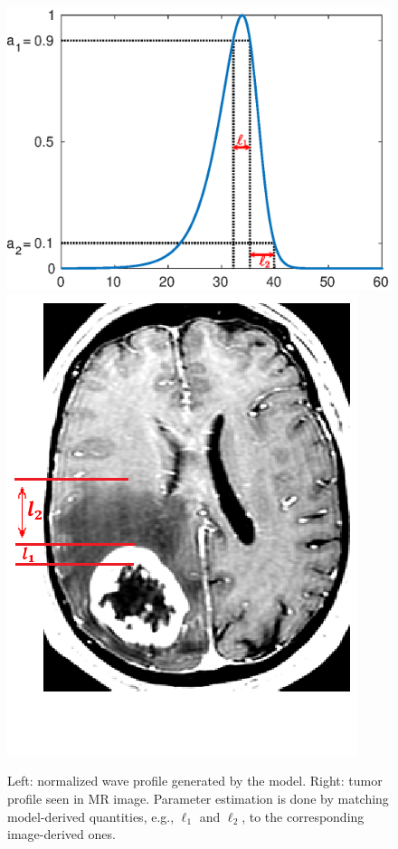 \documentclass{aims}
\numberwithin{equation}{section}
\begin{document}
\begin{figure}
\begin{center}
\includegraphics[scale=0.6]{plots/waveprofile.eps}\includegraphics[scale=0.33]{plots/MR.png}
\end{center}
\caption{\label{fig:Match wid} Left: normalized wave profile generated by the model. Right: tumor profile seen in MR image. Parameter estimation is done by matching model-derived quantities, e.g., $\ell_1$ and $\ell_2$, to the corresponding image-derived ones. }

\end{figure}
\end{document}
